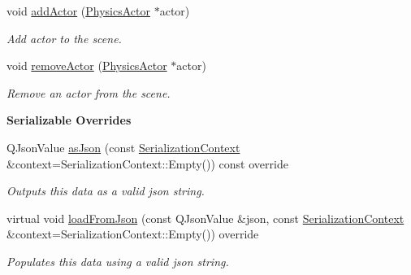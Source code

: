 \begin{Indent}
\begin{DoxyCompactItemize}
\item 
\mbox{\label{classrev_1_1_physics_scene_ab31bfb085b751eba92c1ce979303c06e}} 
void \mbox{\hyperlink{classrev_1_1_physics_scene_ab31bfb085b751eba92c1ce979303c06e}{add\+Actor}} (\mbox{\hyperlink{classrev_1_1_physics_actor}{Physics\+Actor}} $\ast$actor)
\begin{DoxyCompactList}\small\item\em Add actor to the scene. \end{DoxyCompactList}\item 
void \mbox{\hyperlink{classrev_1_1_physics_scene_a899ac2eb1fa688ad99042406ec105688}{remove\+Actor}} (\mbox{\hyperlink{classrev_1_1_physics_actor}{Physics\+Actor}} $\ast$actor)
\begin{DoxyCompactList}\small\item\em Remove an actor from the scene. \end{DoxyCompactList}\end{DoxyCompactItemize}
\end{Indent}
\begin{Indent}\textbf{ Serializable Overrides}\par
\begin{DoxyCompactItemize}
\item 
\mbox{\label{classrev_1_1_physics_scene_aff9e4c7ccb2500d3202c9f61de23a25e}} 
Q\+Json\+Value \mbox{\hyperlink{classrev_1_1_physics_scene_aff9e4c7ccb2500d3202c9f61de23a25e}{as\+Json}} (const \mbox{\hyperlink{structrev_1_1_serialization_context}{Serialization\+Context}} \&context=Serialization\+Context\+::\+Empty()) const override
\begin{DoxyCompactList}\small\item\em Outputs this data as a valid json string. \end{DoxyCompactList}\item 
\mbox{\label{classrev_1_1_physics_scene_a440b7496f3890ce184172bb9a5e29180}} 
virtual void \mbox{\hyperlink{classrev_1_1_physics_scene_a440b7496f3890ce184172bb9a5e29180}{load\+From\+Json}} (const Q\+Json\+Value \&json, const \mbox{\hyperlink{structrev_1_1_serialization_context}{Serialization\+Context}} \&context=Serialization\+Context\+::\+Empty()) override
\begin{DoxyCompactList}\small\item\em Populates this data using a valid json string. \end{DoxyCompactList}\end{DoxyCompactItemize}
\end{Indent}
